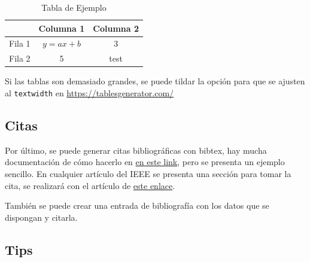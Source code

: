 \begin{table}[!h]
\centering
\begin{tabular}{|c|c|c|}
\hline
\rowcolor[HTML]{9698ED} 
\textbf{} & \textbf{Columna 1} & \textbf{Columna 2} \\ \hline
Fila 1 & $y = ax + b$ & 3 \\ \hline
Fila 2 & 5 & test \\ \hline
\end{tabular}
\caption{Tabla de Ejemplo}
\label{tab:tabla_ejemplo}
\end{table}

Si las tablas son demasiado grandes, se puede tildar la opción para que se ajusten al \texttt{textwidth} en \url{https://tablesgenerator.com/} 

\subsection{Citas}

Por último, se puede generar citas bibliográficas con bibtex, hay mucha documentación de cómo hacerlo en \href{https://www.overleaf.com/learn/latex/Bibliography_management_with_bibtex}{en este link}, pero se presenta un ejemplo sencillo. En cualquier artículo del IEEE se presenta una sección para tomar la cita, se realizará con el artículo de \href{https://ieeexplore.ieee.org/document/8310054}{este enlace}. \cite{8310054}

También se puede crear una entrada de bibliografía con los datos que se dispongan y citarla. \cite{ea3_2023}

\subsection{Tips}

